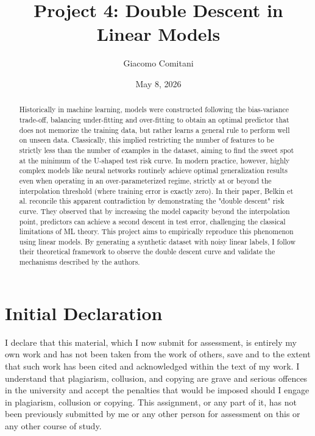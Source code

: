 \documentclass[11pt,a4paper]{article}
\title{\textbf{Project 4: Double Descent in Linear Models}}
\author{Giacomo Comitani}
\date{May 8, 2026}
\begin{document}
\maketitle

\begin{abstract}
Historically in machine learning, models were constructed following the bias-variance trade-off, balancing under-fitting and over-fitting to obtain an optimal predictor that does not memorize the training data, but rather learns a general rule to perform well on unseen data. Classically, this implied restricting the number of features to be strictly less than the number of examples in the dataset, aiming to find the sweet spot at the minimum of the U-shaped test risk curve. In modern practice, however, highly complex models like neural networks routinely achieve optimal generalization results even when operating in an over-parameterized regime, strictly at or beyond the interpolation threshold (where training error is exactly zero). In their paper, Belkin et al. \cite{belkin2019reconciling} reconcile this apparent contradiction by demonstrating the "double descent" risk curve. They observed that by increasing the model capacity beyond the interpolation point, predictors can achieve a second descent in test error, challenging the classical limitations of ML theory. This project aims to empirically reproduce this phenomenon using linear models. By generating a synthetic dataset with noisy linear labels, I follow their theoretical framework to observe the double descent curve and validate the mechanisms described by the authors.
\end{abstract}

\tableofcontents
\vspace{2em}

\section{Initial Declaration}

I declare that this material, which I now submit for assessment, is entirely my own work and has not been taken from the work of others, save and to the extent that such work has been cited and acknowledged within the text of my work. I understand that plagiarism, collusion, and copying are grave and serious offences in the university and accept the penalties that would be imposed should I engage in plagiarism, collusion or copying. This assignment, or any part of it, has not been previously submitted by me or any other person for assessment on this or any other course of study.
\end{document}
